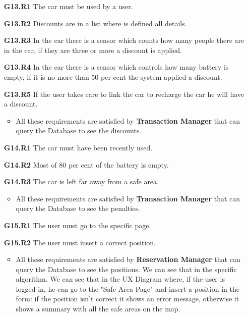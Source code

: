 \begin{itemize}
\item[\textbf{G13.R1}] The car must be used by a user.
\item[\textbf{G13.R2}] Discounts are in a list where is defined all details.
\item[\textbf{G13.R3}] In the car there is a sensor which counts how many people there are in the car, if they are three or more a discount is applied.
\item[\textbf{G13.R4}] In the car there is a sensor which controls how many battery is empty, if it is no more than 50 per cent the system applied a discount.
\item[\textbf{G13.R5}] If the user takes care to link the car to recharge the car he will have a discount.
\begin{itemize}
\item All these requirements are satisfied by \textbf{Transaction Manager} that can query the Database to see the discounts.
\end{itemize}

\item[\textbf{G14.R1}] The car must have been recently used.
\item[\textbf{G14.R2}] Most of 80 per cent of the battery is empty.
\item[\textbf{G14.R3}] The car is left far away from a safe area.
\begin{itemize}
\item All these requirements are satisfied by \textbf{Transaction Manager} that can query the Database to see the penalties.
\end{itemize}

\item[\textbf{G15.R1}] The user must go to the specific page.
\item[\textbf{G15.R2}] The user must insert a correct position.
\begin{itemize}
\item All these requirements are satisfied by \textbf{Reservation Manager} that can query the Database to see the positions. We can see that in the specific algorithm. We can see that in the UX Diagram where, if the user is logged in, he can go to the "Safe Area Page" and insert a position in the form: if the position isn't correct it shows an error message, otherwise it shows a summary with all the safe areas on the map.
\end{itemize} 


\end{itemize}
